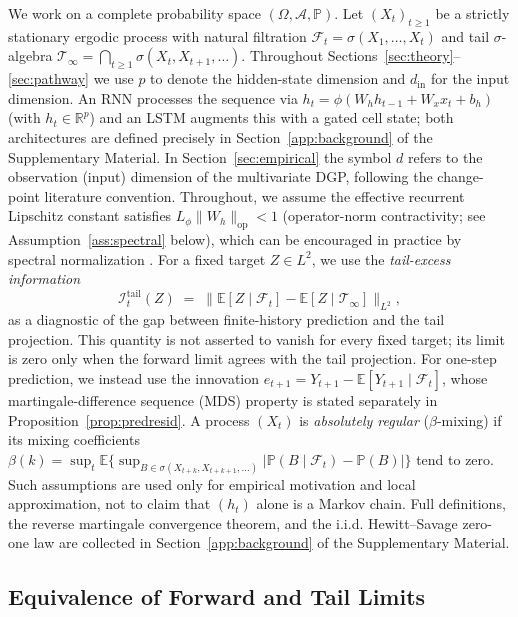 \documentclass[bj,authoryear]{imsart}
\theoremstyle{plain}
\theoremstyle{definition}
\newcommand{\E}{\mathbb{E}}
\newcommand{\Prob}{\mathbb{P}}
\newcommand{\R}{\mathbb{R}}
\newcommand{\F}{\mathcal{F}}
\newcommand{\Tsig}{\mathcal{T}_\infty}
\begin{document}

We work on a complete probability space $(\Omega, \mathcal{A}, \mathbb{P})$.
Let $(X_t)_{t\geq 1}$ be a strictly stationary ergodic process with natural
filtration $\mathcal{F}_t = \sigma(X_1,\ldots,X_t)$ and tail $\sigma$-algebra
$\Tsig = \bigcap_{t\geq 1}\sigma(X_t, X_{t+1},\ldots)$.
Throughout Sections~\ref{sec:theory}--\ref{sec:pathway} we use $p$ to denote the hidden-state dimension and $d_{\mathrm{in}}$ for the input dimension.
An RNN processes the sequence via $h_t = \phi(W_h h_{t-1} + W_x x_t + b_h)$ (with $h_t\in\R^p$)
and an LSTM augments this with a gated cell state; both architectures are
defined precisely in Section~\ref{app:background} of the Supplementary Material.
In Section~\ref{sec:empirical} the symbol $d$ refers to the
observation (input) dimension of the multivariate DGP, following the
change-point literature convention.
Throughout, we assume the effective recurrent Lipschitz constant satisfies
$L_\phi\|W_h\|_{\mathrm{op}} < 1$ (operator-norm contractivity;
see Assumption~\ref{ass:spectral} below),
which can be encouraged in practice by spectral normalization
\citep{miyato2018spectral}.  For a fixed target $Z\in L^2$, we use the
\emph{tail-excess information}
\[
  \mathcal{I}_t^{\mathrm{tail}}(Z)
  \;=\; \bigl\|\E[Z\mid\mathcal{F}_t] - \E[Z\mid\Tsig]\bigr\|_{L^2},
\]
as a diagnostic of the gap between finite-history prediction and the tail
projection.  This quantity is not asserted to vanish for every fixed target;
its limit is zero only when the forward limit agrees with the tail projection.
For one-step prediction, we instead use the innovation
$e_{t+1}=Y_{t+1}-\E[Y_{t+1}\mid\mathcal F_t]$, whose martingale-difference
sequence (MDS) property is stated separately in Proposition~\ref{prop:predresid}.
A process $(X_t)$ is \emph{absolutely regular} ($\beta$-mixing) if its
mixing coefficients
$\beta(k)=\sup_t\E\{\sup_{B\in\sigma(X_{t+k},X_{t+k+1},\ldots)}
|\Prob(B\mid\F_t)-\Prob(B)|\}$ tend to zero.  Such assumptions are used only
for empirical motivation and local approximation, not to claim that $(h_t)$
alone is a Markov chain.
Full definitions, the reverse martingale convergence theorem, and the
i.i.d. Hewitt--Savage zero-one law are collected in Section~\ref{app:background} of the Supplementary Material.

\subsection{Equivalence of Forward and Tail Limits}
\label{sec:lemma}
\end{document}
